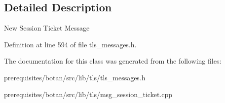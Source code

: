 \subsection{Detailed Description}
New Session Ticket Message 

Definition at line 594 of file tls\+\_\+messages.\+h.



The documentation for this class was generated from the following files\+:\begin{DoxyCompactItemize}
\item 
prerequisites/botan/src/lib/tls/tls\+\_\+messages.\+h\item 
prerequisites/botan/src/lib/tls/msg\+\_\+session\+\_\+ticket.\+cpp\end{DoxyCompactItemize}
